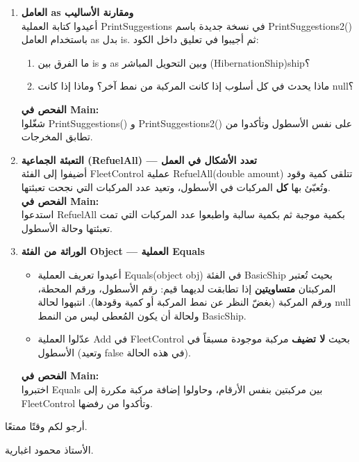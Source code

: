 \documentclass[14pt]{extarticle}
\begin{document}
\begin{enumerate}[resume, label=\textbf{تمرين \arabic*:}, wide=0pt, leftmargin=*, itemsep=2.2em]
    \item \textbf{العامل \textenglish{as} ومقارنة الأساليب} \\
    أعيدوا كتابة العملية \textenglish{PrintSuggestions} في نسخة جديدة باسم \textenglish{PrintSuggestions2()} باستخدام العامل \textenglish{as} بدل \textenglish{is}. ثم أجيبوا في تعليق داخل الكود:
    \begin{enumerate}[label=\textbf{\arabic*.}]
        \item ما الفرق بين \textenglish{is} و \textenglish{as} وبين التحويل المباشر \textenglish{(HibernationShip)ship}؟
        \item ماذا يحدث في كل أسلوب إذا كانت المركبة من نمط آخر؟ وماذا إذا كانت \textenglish{null}؟
    \end{enumerate}
    \textbf{الفحص في \textenglish{Main}:} \\
    شغّلوا \textenglish{PrintSuggestions()} و \textenglish{PrintSuggestions2()} على نفس الأسطول وتأكدوا من تطابق المخرجات.

    \item \textbf{التعبئة الجماعية (\textenglish{RefuelAll}) — تعدد الأشكال في العمل} \\
    أضيفوا إلى الفئة \textenglish{FleetControl} عملية \textenglish{RefuelAll(double amount)} تتلقى كمية وقود وتُعبّئ بها \textbf{كل} المركبات في الأسطول، وتعيد عدد المركبات التي نجحت تعبئتها. \\
    \textbf{الفحص في \textenglish{Main}:} \\
    استدعوا \textenglish{RefuelAll} بكمية موجبة ثم بكمية سالبة واطبعوا عدد المركبات التي تمت تعبئتها وحالة الأسطول.

    \item \textbf{الوراثة من الفئة \textenglish{Object} — العملية \textenglish{Equals}}
    \begin{itemize}
        \item أعيدوا تعريف العملية \textenglish{Equals(object obj)} في الفئة \textenglish{BasicShip} بحيث تُعتبر المركبتان \textbf{متساويتين} إذا تطابقت لديهما قيم: رقم الأسطول، ورقم المحطة، ورقم المركبة (بغضّ النظر عن نمط المركبة أو كمية وقودها). انتبهوا لحالة \textenglish{null} ولحالة أن يكون المُعطى ليس من النمط \textenglish{BasicShip}.
        \item عدّلوا العملية \textenglish{Add} في \textenglish{FleetControl} بحيث \textbf{لا تضيف} مركبة موجودة مسبقاً في الأسطول (وتعيد \textenglish{false} في هذه الحالة).
    \end{itemize}
    \textbf{الفحص في \textenglish{Main}:} \\
    اختبروا \textenglish{Equals} بين مركبتين بنفس الأرقام، وحاولوا إضافة مركبة مكررة إلى \textenglish{FleetControl} وتأكدوا من رفضها.

\end{enumerate}

\vspace{1cm}
\begin{flushleft}
أرجو لكم وقتًا ممتعًا.

الأستاذ محمود اغبارية.
\end{flushleft}
\end{document}
